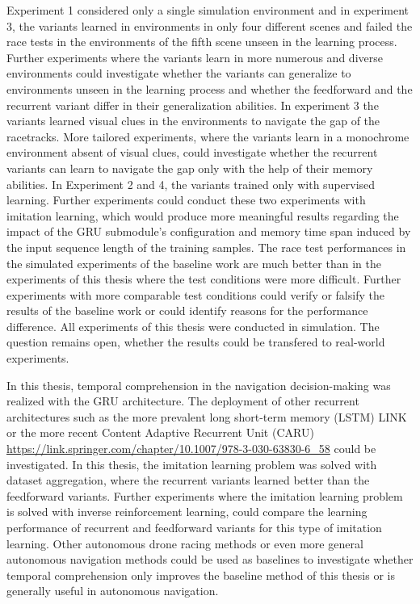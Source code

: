 Experiment 1 considered only a single simulation environment
and in experiment 3, the variants learned in environments in only four different scenes
and failed the race tests in the environments of the fifth scene unseen in the learning process.
Further experiments where the variants learn in more numerous and diverse environments
could investigate whether the variants can generalize to environments unseen in the learning process
and whether the feedforward and the recurrent variant differ in their generalization abilities.
In experiment 3 the variants learned visual clues in the environments to navigate the gap of the racetracks.
More tailored experiments, where the variants learn in a monochrome environment absent of visual clues,
could investigate whether the recurrent variants can learn to navigate the gap only with the help of their memory abilities.
In Experiment 2 and 4, the variants trained only with supervised learning.
Further experiments could conduct these two experiments with imitation learning,
which would produce more meaningful results regarding the impact of the
GRU submodule's configuration and memory time span
induced by the input sequence length of the training samples.
The race test performances in the simulated experiments of the baseline work are much better than
in the experiments of this thesis where the test conditions were more difficult.
Further experiments with more comparable test conditions
could verify or falsify the results of the baseline work 
or could identify reasons for the performance difference.
All experiments of this thesis were conducted in simulation.
The question remains open, whether the results could be transfered to real-world experiments.

In this thesis, temporal comprehension in the navigation decision-making
was realized with the GRU architecture.
The deployment of other recurrent architectures such as the
more prevalent long short-term memory (LSTM) LINK or the more recent
Content Adaptive Recurrent Unit (CARU)
\url{https://link.springer.com/chapter/10.1007/978-3-030-63830-6_58}
could be investigated.
In this thesis, the imitation learning problem was solved with dataset aggregation,
where the recurrent variants learned better than the feedforward variants.
Further experiments where the imitation learning problem is solved with inverse reinforcement learning,
could compare the learning performance of recurrent and feedforward variants for this type of imitation learning.
Other autonomous drone racing methods or even more general autonomous navigation methods
could be used as baselines to investigate whether temporal comprehension only improves the baseline method 
of this thesis or is generally useful in autonomous navigation.




